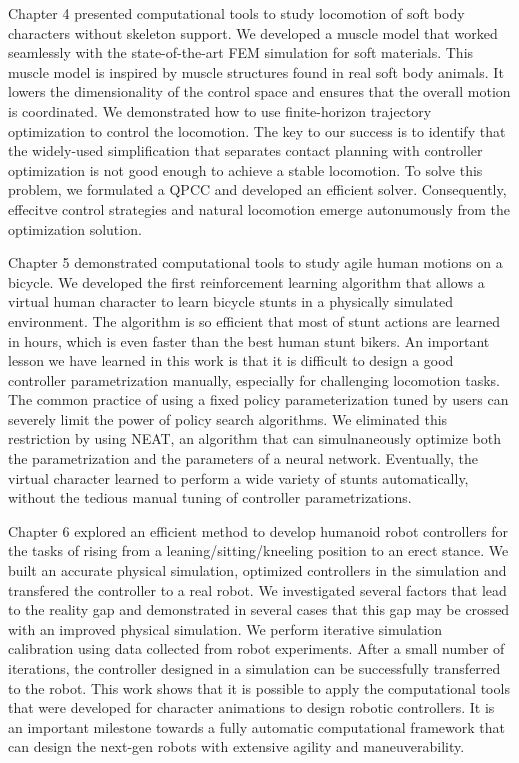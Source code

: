 Chapter 4 presented computational tools to study locomotion of soft body characters without skeleton support. We developed a muscle model that worked seamlessly with the state-of-the-art FEM simulation for soft materials. This muscle model is inspired by muscle structures found in real soft body animals. It lowers the dimensionality of the control space and ensures that the overall motion is coordinated. We demonstrated how to use finite-horizon trajectory optimization to control the locomotion. The key to our success is to identify that the widely-used simplification that separates contact planning with controller optimization is not good enough to achieve a stable locomotion. To solve this problem, we formulated a QPCC and developed an efficient solver. Consequently, effecitve control strategies and natural locomotion emerge autonumously from the optimization solution.

Chapter 5 demonstrated computational tools to study agile human motions on a bicycle. We developed the first reinforcement learning algorithm that allows a virtual human character to learn bicycle stunts in a physically simulated environment. The algorithm is so efficient that most of stunt actions are learned in hours, which is even faster than the best human stunt bikers. An important lesson we have learned in this work is that it is difficult to design a good controller parametrization manually, especially for challenging locomotion tasks. The common practice of using a fixed policy parameterization tuned by users can severely limit the power of policy search algorithms. We eliminated this restriction by using NEAT, an algorithm that can simulnaneously optimize both the parametrization and the parameters of a neural network. Eventually, the virtual character learned to perform a wide variety of stunts automatically, without the tedious manual tuning of controller parametrizations.

Chapter 6 explored an efficient method to develop humanoid robot controllers for the tasks of rising from a leaning/sitting/kneeling position to an erect stance. We built an accurate physical simulation, optimized controllers in the simulation and transfered the controller to a real robot. We investigated several factors that lead to the reality gap and demonstrated in several cases that this gap may be crossed with an improved physical simulation. We perform iterative simulation calibration using data collected from robot experiments. After a small number of iterations, the controller designed in a simulation can be successfully transferred to the robot. This work shows that it is possible to apply the computational tools that were developed for character animations to design robotic controllers. It is an important milestone towards a fully automatic computational framework that can design the next-gen robots with extensive agility and maneuverability.

